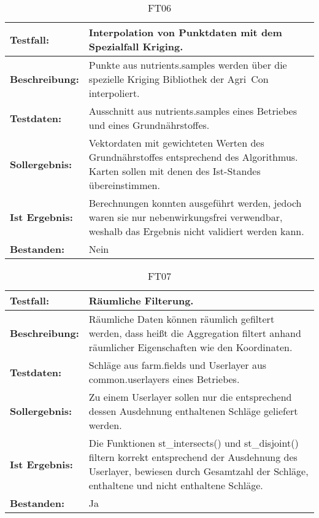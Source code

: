 \begin{table}[h!]
\centering
\small
\begin{tabular}{p{2.8cm}|p{12cm}}
\textbf{Testfall:} & Interpolation von Punktdaten mit dem Spezialfall Kriging. \\ \hline
\textbf{Beschreibung:} & Punkte aus nutrients.samples werden über die spezielle Kriging Bibliothek der Agri~Con interpoliert. \\ \hline
\textbf{Testdaten:} & Ausschnitt aus nutrients.samples eines Betriebes und eines Grundnährstoffes. \\ \hline
\textbf{Sollergebnis:} & Vektordaten mit gewichteten Werten des Grundnährstoffes entsprechend des Algorithmus. Karten sollen mit denen des Ist-Standes übereinstimmen. \\ \hline
\textbf{Ist Ergebnis:} & Berechnungen konnten ausgeführt werden, jedoch waren sie nur nebenwirkungsfrei verwendbar, weshalb das Ergebnis nicht validiert werden kann. \\ \hline
\textbf{Bestanden:} & Nein \\
\end{tabular}
\caption*{FT06}
\end{table}

\begin{table}[h!]
\centering
\small
\begin{tabular}{p{2.8cm}|p{12cm}}
\textbf{Testfall:} & Räumliche Filterung. \\ \hline
\textbf{Beschreibung:} & Räumliche Daten können räumlich gefiltert werden, dass heißt die Aggregation filtert anhand räumlicher Eigenschaften wie den Koordinaten. \\ \hline
\textbf{Testdaten:} & Schläge aus farm.fields und Userlayer aus common.userlayers eines Betriebes. \\ \hline
\textbf{Sollergebnis:} & Zu einem Userlayer sollen nur die entsprechend dessen Ausdehnung enthaltenen Schläge geliefert werden. \\ \hline
\textbf{Ist Ergebnis:} & Die Funktionen st\_{}intersects() und st\_{}disjoint() filtern korrekt entsprechend der Ausdehnung des Userlayer, bewiesen durch Gesamtzahl der Schläge, enthaltene und nicht enthaltene Schläge. \\ \hline
\textbf{Bestanden:} & Ja \\
\end{tabular}
\caption*{FT07}
\end{table}

\capstarttrue
